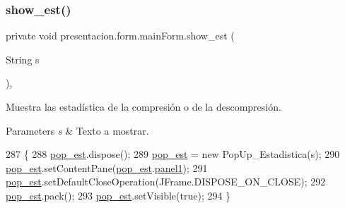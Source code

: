 \subsubsection{\texorpdfstring{show\+\_\+est()}{show\_est()}}
{\footnotesize\ttfamily private void presentacion.\+form.\+main\+Form.\+show\+\_\+est (\begin{DoxyParamCaption}\item[{String}]{s }\end{DoxyParamCaption})\hspace{0.3cm}{\ttfamily [inline]}, {\ttfamily [private]}}



Muestra las estadística de la compresión o de la descompresión. 


\begin{DoxyParams}{Parameters}
{\em s} & Texto a mostrar. \\
\hline
\end{DoxyParams}

\begin{DoxyCode}
287                                     \{
288         \hyperlink{classpresentacion_1_1form_1_1mainForm_ae04f75ed65fa9e0347f645e877f6eb95}{pop\_est}.dispose();
289         \hyperlink{classpresentacion_1_1form_1_1mainForm_ae04f75ed65fa9e0347f645e877f6eb95}{pop\_est} = \textcolor{keyword}{new} PopUp\_Estadistica(s);
290         \hyperlink{classpresentacion_1_1form_1_1mainForm_ae04f75ed65fa9e0347f645e877f6eb95}{pop\_est}.setContentPane(\hyperlink{classpresentacion_1_1form_1_1mainForm_ae04f75ed65fa9e0347f645e877f6eb95}{pop\_est}.\hyperlink{classpresentacion_1_1form_1_1PopUp__Estadistica_ac276266d42b873f89883dd3a869feadf}{panel1});
291         \hyperlink{classpresentacion_1_1form_1_1mainForm_ae04f75ed65fa9e0347f645e877f6eb95}{pop\_est}.setDefaultCloseOperation(JFrame.DISPOSE\_ON\_CLOSE);
292         \hyperlink{classpresentacion_1_1form_1_1mainForm_ae04f75ed65fa9e0347f645e877f6eb95}{pop\_est}.pack();
293         \hyperlink{classpresentacion_1_1form_1_1mainForm_ae04f75ed65fa9e0347f645e877f6eb95}{pop\_est}.setVisible(\textcolor{keyword}{true});
294     \}
\end{DoxyCode}
\mbox{\label{classpresentacion_1_1form_1_1mainForm_aa71c48a8ef6eb2b3913dd665e5439538}} 
